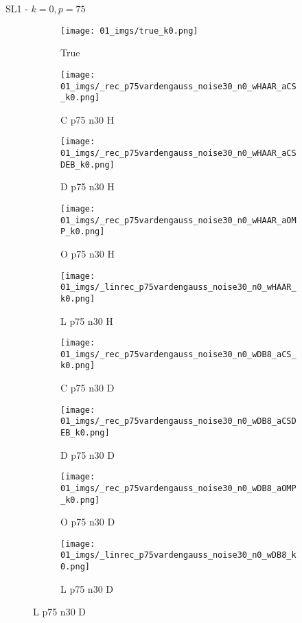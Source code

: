 \begin{frame}{SL1 - $k=0,p=75$}{}
\begin{figure}
\begin{subfigure}{0.1\textwidth}
\texttt{[image: 01\_imgs/true\_k0.png]}
\caption*{\Tiny True}
\end{subfigure}
\begin{subfigure}{0.1\textwidth}
\texttt{[image: 01\_imgs/\_rec\_p75vardengauss\_noise30\_n0\_wHAAR\_aCS\_k0.png]}
\caption*{\Tiny C p75 n30 H}
\end{subfigure}
\begin{subfigure}{0.1\textwidth}
\texttt{[image: 01\_imgs/\_rec\_p75vardengauss\_noise30\_n0\_wHAAR\_aCSDEB\_k0.png]}
\caption*{\Tiny D p75 n30 H}
\end{subfigure}
\begin{subfigure}{0.1\textwidth}
\texttt{[image: 01\_imgs/\_rec\_p75vardengauss\_noise30\_n0\_wHAAR\_aOMP\_k0.png]}
\caption*{\Tiny O p75 n30 H}
\end{subfigure}
\begin{subfigure}{0.1\textwidth}
\texttt{[image: 01\_imgs/\_linrec\_p75vardengauss\_noise30\_n0\_wHAAR\_k0.png]}
\caption*{\Tiny L p75 n30 H}
\end{subfigure}
\begin{subfigure}{0.1\textwidth}
\texttt{[image: 01\_imgs/\_rec\_p75vardengauss\_noise30\_n0\_wDB8\_aCS\_k0.png]}
\caption*{\Tiny C p75 n30 D}
\end{subfigure}
\begin{subfigure}{0.1\textwidth}
\texttt{[image: 01\_imgs/\_rec\_p75vardengauss\_noise30\_n0\_wDB8\_aCSDEB\_k0.png]}
\caption*{\Tiny D p75 n30 D}
\end{subfigure}
\begin{subfigure}{0.1\textwidth}
\texttt{[image: 01\_imgs/\_rec\_p75vardengauss\_noise30\_n0\_wDB8\_aOMP\_k0.png]}
\caption*{\Tiny O p75 n30 D}
\end{subfigure}
\begin{subfigure}{0.1\textwidth}
\texttt{[image: 01\_imgs/\_linrec\_p75vardengauss\_noise30\_n0\_wDB8\_k0.png]}
\caption*{\Tiny L p75 n30 D}
\end{subfigure}
\end{figure}
\end{frame}


